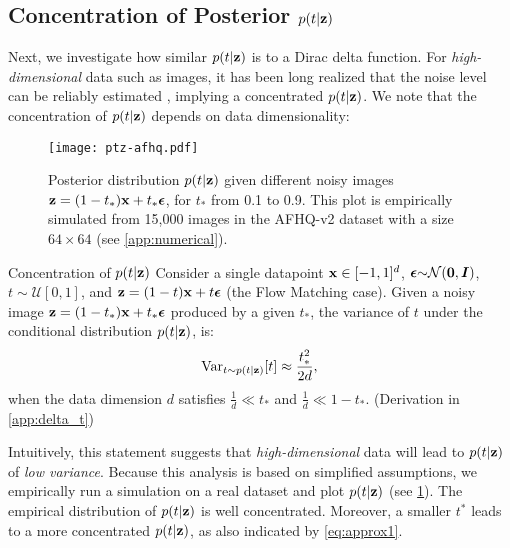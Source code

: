 \subsection{Concentration of Posterior $p(t|{\mathbf{z}})$}\label{subsec:ptz}

Next, we investigate how similar $p(t|{\mathbf{z}})$ is to a Dirac delta function.
For \textit{high-dimensional} data such as images, it has been long realized that the noise level can be reliably estimated \cite{stahl2000quantile,salmeri2001noise,shin2005block}, implying a concentrated $p(t|{\mathbf{z}})$. We note that the concentration of $p(t|{\mathbf{z}})$ depends on data dimensionality: 


 \begin{figure}
    \centering
    \texttt{[image: ptz-afhq.pdf]}
    \vspace{-1em}
    \caption{Posterior distribution $p(t|{\mathbf{z}})$ given different noisy images ${\mathbf{z}} = (1-t_*){\mathbf{x}} + t_*{\bm{\epsilon}}$, for $t_*$ from 0.1 to 0.9. This plot is empirically simulated from 15,000 images in the AFHQ-v2 dataset with a size $64{\times} 64$ (see \cref{app:numerical}).}
    \label{fig:ptz}
\end{figure}


\begin{statement}{{Concentration of $p(t|{\mathbf{z}})$}}\label{approx:var}
Consider a single datapoint ${\mathbf{x}}\in[-1,1]^d$, ${\bm{\epsilon}}{\sim}\mathcal{N}(\bm0,{\bm{I}})$, $t{\sim} \mathcal{U}[0,1]$, and ${\mathbf{z}} = (1-t){\mathbf{x}} + t{\bm{\epsilon}}$ (the Flow Matching case). Given a noisy image ${\mathbf{z}} = (1-t_*){\mathbf{x}} + t_*{\bm{\epsilon}}$ produced by a given $t_*$, the variance of $t$ under the conditional distribution $p(t|{\mathbf{z}})$, is:
    \begin{align}\label{eq:approx1}
        \mathrm{Var}_{t\sim p(t|{\mathbf{z}})} [t] \approx \frac{t_*^2}{2d},
    \end{align}
when the data dimension $d$ satisfies $\frac{1}{d} \ll t_*$ and $\frac{1}{d} \ll 1-t_*$. (Derivation in \cref{app:delta_t})
\end{statement}
\vspace{.5em}
Intuitively, this statement suggests that \textit{high-dimensional} data will lead to $p(t|{\mathbf{z}})$ of \textit{low variance}.
Because this analysis is based on simplified assumptions, we empirically run a simulation on a real dataset and plot $p(t|{\mathbf{z}})$ (see \cref{fig:ptz}). The empirical distribution of $p(t|{\mathbf{z}})$ is well concentrated. Moreover, a smaller $t^*$ leads to a more concentrated $p(t|{\mathbf{z}})$, as also indicated by \cref{eq:approx1}.


